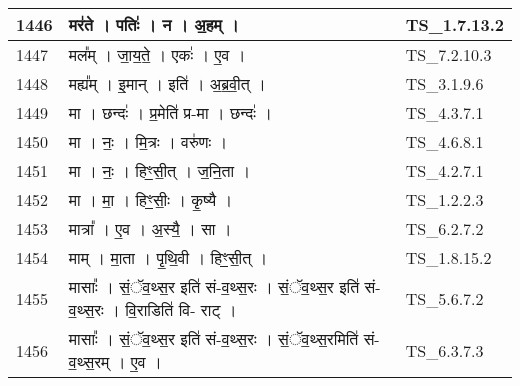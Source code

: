 \documentclass[17pt]{extarticle}
\begin{document}
\begin{longtable}{||p{0.4in}||p{4.9in}||p{0.9in}||}
    \hline
        
    1446 & मर॑ते   ।   पतिः॑   ।   न   ।   अ॒हम्   ।    & TS\_1.7.13.2       \\
    
    \hline
        
    1447 & मल᳚म्   ।   जा॒य॒ते॒   ।   एकः॑   ।   ए॒व   ।    & TS\_7.2.10.3       \\
    
    \hline
        
    1448 & मह्य᳚म्   ।   इ॒मान्   ।   इति॑   ।   अ॒ब्र॒वी॒त्   ।    & TS\_3.1.9.6       \\
    
    \hline
        
    1449 & मा   ।   छन्दः॑   ।   प्र॒मेति॑ प्र{-}मा   ।   छन्दः॑   ।    & TS\_4.3.7.1       \\
    
    \hline
        
    1450 & मा   ।   नः॒   ।   मि॒त्रः   ।   वरु॑णः   ।    & TS\_4.6.8.1       \\
    
    \hline
        
    1451 & मा   ।   नः॒   ।   हिꣳ॒॒सी॒त्   ।   ज॒नि॒ता   ।    & TS\_4.2.7.1       \\
    
    \hline
        
    1452 & मा   ।   मा॒   ।   हिꣳ॒॒सीः॒   ।   कृ॒ष्यै   ।    & TS\_1.2.2.3       \\
    
    \hline
        
    1453 & मात्रा᳚   ।   ए॒व   ।   अ॒स्यै॒   ।   सा   ।    & TS\_6.2.7.2       \\
    
    \hline
        
    1454 & माम्   ।   मा॒ता   ।   पृ॒थि॒वी   ।   हिꣳ॒॒सी॒त्   ।    & TS\_1.8.15.2       \\
    
    \hline
        
    1455 & मासाः᳚   ।   सं॒ॅव॒थ्स॒र इति॑ सं{-}व॒थ्स॒रः   ।   सं॒ॅव॒थ्स॒र इति॑ सं{-}व॒थ्स॒रः   ।   वि॒राडिति॑ वि{-}  राट्   ।    & TS\_5.6.7.2       \\
    
    \hline
        
    1456 & मासाः᳚   ।   सं॒ॅव॒थ्स॒र इति॑ सं{-}व॒थ्स॒रः   ।   सं॒ॅव॒थ्स॒रमिति॑ सं{-}व॒थ्स॒रम्   ।   ए॒व   ।    & TS\_6.3.7.3       \\
    

\end{longtable}
\end{document}
